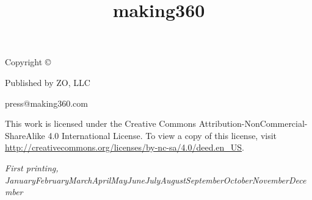 \documentclass[notoc]{tufte-book} %
\title{making360} %
\author{} %
\newcommand{\monthyear}{\ifcase\month\or January\or February\or March\or April\or May\or June\or July\or August\or September\or October\or November\or December\fi\space\number\year} %
\begin{document}
\setlength{\parskip}{0.8cm plus0.5mm minus0.5mm}
\setlength{\parindent}{0pt}
\let\cleardoublepage\clearpage

\makeatletter
\def\@makechapterhead#1{%
  {\parindent \z@ \raggedright \normalfont
    \ifnum \c@secnumdepth >\m@ne
        \huge\bfseries \@chapapp\space \thechapter
        \par\nobreak
        \vskip 20\p@
    \fi
    \interlinepenalty\@M
    \Huge \bfseries #1\par\nobreak
    \vskip 20\p@
  }}
\makeatother


\frontmatter



\maketitle %


\newpage
\begin{fullwidth}
\thispagestyle{empty}
\setlength{\parindent}{0pt}
\setlength{\parskip}{\baselineskip}
Copyright \copyright\ \the\year\ \thanklessauthor

\par{Published by ZO, LLC}

\par{press@making360.com}

\par This work is licensed under the Creative Commons Attribution-NonCommercial-ShareAlike 4.0 International License. To view a copy of this license, visit \url{http://creativecommons.org/licenses/by-nc-sa/4.0/deed.en_US}.

\par\textit{First printing, \monthyear}
\end{fullwidth}


\tableofcontents %


\end{document}
